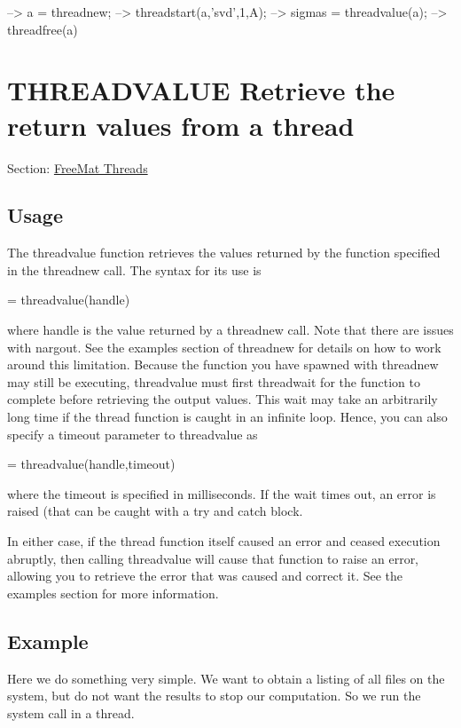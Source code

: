 \begin{DoxyVerbInclude}
--> a = threadnew;
--> threadstart(a,'svd',1,A);
--> sigmas = threadvalue(a);
--> threadfree(a)
\end{DoxyVerbInclude}
 \hypertarget{thread_threadvalue}{}\section{T\-H\-R\-E\-A\-D\-V\-A\-L\-U\-E Retrieve the return values from a thread}\label{thread_threadvalue}
Section\-: \hyperlink{sec_thread}{Free\-Mat Threads} \hypertarget{vtkwidgets_vtkxyplotwidget_Usage}{}\subsection{Usage}\label{vtkwidgets_vtkxyplotwidget_Usage}
The {\ttfamily threadvalue} function retrieves the values returned by the function specified in the {\ttfamily threadnew} call. The syntax for its use is \begin{DoxyVerb}    = threadvalue(handle)
\end{DoxyVerb}
 where {\ttfamily handle} is the value returned by a {\ttfamily threadnew} call. Note that there are issues with {\ttfamily nargout}. See the examples section of {\ttfamily threadnew} for details on how to work around this limitation. Because the function you have spawned with {\ttfamily threadnew} may still be executing, {\ttfamily threadvalue} must first {\ttfamily threadwait} for the function to complete before retrieving the output values. This wait may take an arbitrarily long time if the thread function is caught in an infinite loop. Hence, you can also specify a timeout parameter to {\ttfamily threadvalue} as \begin{DoxyVerb}    = threadvalue(handle,timeout)
\end{DoxyVerb}
 where the {\ttfamily timeout} is specified in milliseconds. If the wait times out, an error is raised (that can be caught with a {\ttfamily try} and {\ttfamily catch} block.

In either case, if the thread function itself caused an error and ceased execution abruptly, then calling {\ttfamily threadvalue} will cause that function to raise an error, allowing you to retrieve the error that was caused and correct it. See the examples section for more information. \hypertarget{variables_struct_Example}{}\subsection{Example}\label{variables_struct_Example}
Here we do something very simple. We want to obtain a listing of all files on the system, but do not want the results to stop our computation. So we run the {\ttfamily system} call in a thread.


